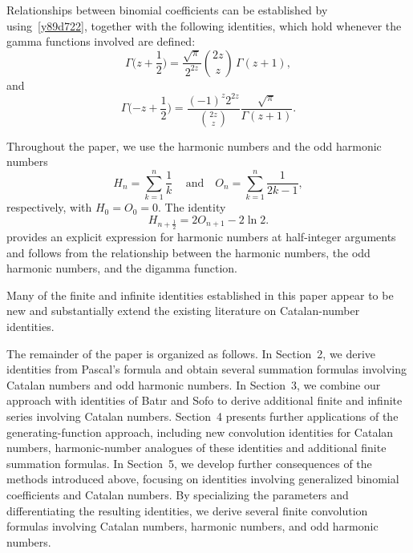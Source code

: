 \documentclass[12pt,reqno]{article}
\begin{document}
Relationships between binomial coefficients can be established by using~\eqref{y89d722}, together with the following identities,  
which hold whenever the gamma functions involved are defined:
\begin{equation}\label{Gamma12+}
\Gamma \Big( {z + \frac{1}{2}} \Big) = \frac{\sqrt \pi}{2^{2z}}\binom{{2z}}{z}\,\Gamma ({z + 1}),
\end{equation}
and
\begin{equation}\label{Gamma12-}
\Gamma \Big( { - z + \frac{1}{2}} \Big) = \frac{(- 1)^z2^{2z}} {\binom{{2z}}{z}} \frac{{\sqrt \pi}}{{\Gamma (z + 1)}}.
\end{equation}

Throughout the paper, we use the harmonic numbers and the odd harmonic numbers
\begin{equation*}
H_n = \sum_{k=1}^{n} \frac{1}{k}\quad\,\text{and}\quad O_n = \sum_{k=1}^{n}\frac{1}{2k-1},
\end{equation*}
respectively, with $H_0=O_0=0$. The identity
\begin{equation}
H_{n+\frac12} = 2O_{n+1} - 2 \ln 2. \label{H-O-link}
\end{equation}
provides an explicit expression for harmonic numbers at half-integer arguments and follows from the relationship between the harmonic numbers, the odd harmonic numbers, and the digamma function.

Many of the finite and infinite identities established in this paper appear to be new and substantially extend the existing literature on Catalan-number identities.

The remainder of the paper is organized as follows. In Section~2, we derive identities from Pascal's formula and obtain several summation formulas involving Catalan numbers and odd harmonic numbers. In Section~3, we combine our approach with identities of Bat{\i}r and Sofo 
\cite{batirsofo23} to derive additional finite and infinite series involving Catalan numbers. Section~4 presents further applications of the generating-function approach, including new convolution identities for Catalan numbers, harmonic-number analogues of these identities and additional finite summation formulas.
In Section~5, we develop further consequences of the methods introduced above, focusing on identities involving generalized binomial coefficients
	and Catalan numbers. By specializing the parameters and differentiating the
	resulting identities, we derive several finite convolution formulas
	involving Catalan numbers, harmonic numbers, and odd harmonic numbers.
\end{document}
